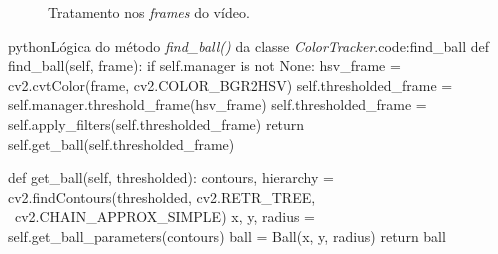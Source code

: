 \begin{figure}[H]
	\centering
	\hspace{3em}
	\caption{Tratamento nos \textit{frames} do vídeo.}
	\label{img:convert_frames}
\end{figure}

\begin{code}{python}{Lógica do método \textit{find\_ball()} da classe \textit{ColorTracker}.}{code:find_ball}
def find_ball(self, frame):
	if self.manager is not None:
		hsv_frame = cv2.cvtColor(frame, cv2.COLOR_BGR2HSV)
		self.thresholded_frame = self.manager.threshold_frame(hsv_frame)
		self.thresholded_frame = self.apply_filters(self.thresholded_frame)
		return self.get_ball(self.thresholded_frame)

def get_ball(self, thresholded):
	contours, hierarchy = cv2.findContours(thresholded, cv2.RETR_TREE, \
		cv2.CHAIN_APPROX_SIMPLE)
	x, y, radius = self.get_ball_parameters(contours)
	ball = Ball(x, y, radius)
	return ball
\end{code}

